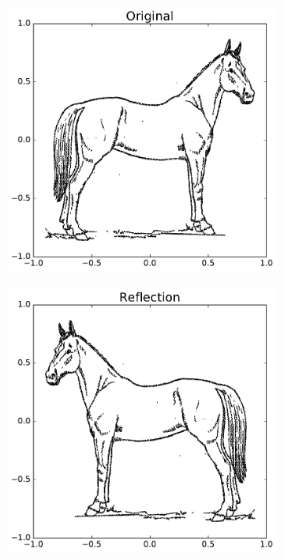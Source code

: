 \begin{figure}[H] %
\captionsetup[subfigure]{justification=centering}
\centering
\begin{subfigure}{.5\textwidth}
    \centering
    \includegraphics[width=\linewidth]{originalHorse.pdf}
\end{subfigure}%
\begin{subfigure}{.5\textwidth}
    \centering
    \includegraphics[width=\linewidth]{ReflectionHorse.pdf}
\end{subfigure}
\label{fig:reflect}
\end{figure}


